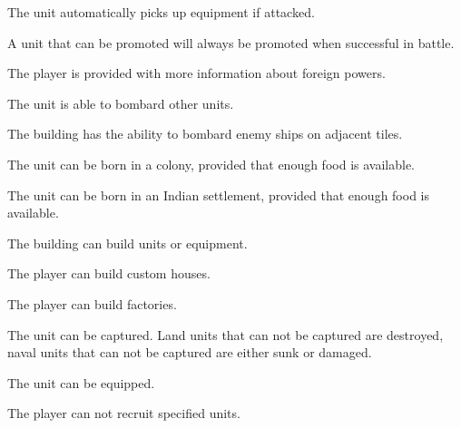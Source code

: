 \documentclass[12pt]{book}
\begin{document}
\affectsUnit

The unit automatically picks up equipment if attacked.

\affectsUnit

A unit that can be promoted will always be promoted when successful in
battle.

\affectsPlayer

The player is provided with more information about foreign powers.

\affectsUnit

The unit is able to bombard other units.

\affectsBuilding

The building has the ability to bombard enemy ships on adjacent tiles.

\affectsUnit

The unit can be born in a colony, provided that enough food is available.

\affectsUnit

The unit can be born in an Indian settlement, provided that enough food is available.

\affectsBuilding

The building can build units or equipment.

\affectsPlayer

The player can build custom houses.

\affectsPlayer

The player can build factories.

\affectsUnit

The unit can be captured. Land units that can not be captured are
destroyed, naval units that can not be captured are either sunk or
damaged.

\affectsUnit

The unit can be equipped.

\affectsPlayer

The player can not recruit specified units.

\affectsUnit
\end{document}
